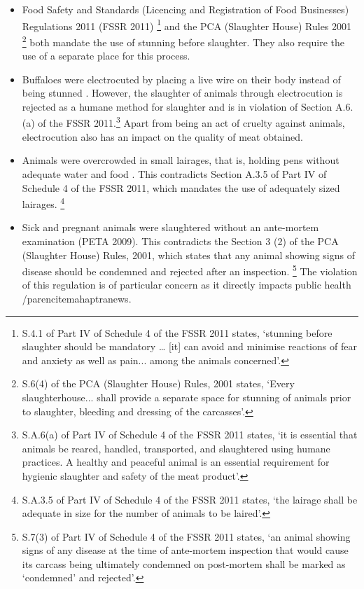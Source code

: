 \documentclass[a4paper, 12pt]{article}
\begin{document}
\begin{itemize}
\item Food Safety and Standards (Licencing and Registration of Food Businesses) Regulations 2011 (FSSR 2011) \footnote{S.4.1 of Part IV of Schedule 4 of the FSSR 2011 states, ‘stunning before slaughter should be mandatory … [it] can avoid and minimise reactions of fear and anxiety as well as pain... among the animals concerned’.} and the PCA (Slaughter House) Rules 2001 \footnote{ S.6(4) of the PCA (Slaughter House) Rules, 2001 states, ‘Every slaughterhouse... shall provide a separate space for stunning of animals prior to slaughter, bleeding and dressing of the carcasses’.} both mandate the use of stunning before slaughter. They also require the use of a separate place for this process.
\item Buffaloes were electrocuted by placing a live wire on their body instead of being stunned \parencite{indiannews} \parencite{petareport}. However, the slaughter of animals through electrocution is rejected as a humane method for slaughter \parencite{chaudrypaper} and is in violation of Section A.6.(a) of the FSSR 2011.\footnote{ S.A.6(a) of Part IV of Schedule 4 of the FSSR 2011 states, ‘it is essential that animals be reared, handled, transported, and slaughtered using humane practices. A healthy and peaceful animal is an essential requirement for hygienic slaughter and safety of the meat product’.} Apart from being an act of cruelty against animals, electrocution also has an impact on the quality of meat obtained.
\item Animals were overcrowded in small lairages, that is, holding pens without adequate water and food \parencite{maanvinews}. This contradicts Section A.3.5 of Part IV of Schedule 4 of the FSSR 2011, which mandates the use of adequately sized lairages. \footnote{ S.A.3.5 of Part IV of Schedule 4 of the FSSR 2011 states, ‘the lairage shall be adequate in size for the number of animals to be laired’.}
\item Sick and pregnant animals were slaughtered without an ante-mortem examination (PETA 2009). This contradicts the Section 3 (2) of the PCA (Slaughter House) Rules, 2001, which states that any animal showing signs of disease should be condemned and rejected after an inspection. \footnote{ S.7(3) of Part IV of Schedule 4 of the FSSR 2011 states, ‘an animal showing signs of any disease at the time of ante-mortem inspection that would cause its carcass being ultimately condemned on post-mortem shall be marked as ‘condemned’ and rejected’.} The violation of this regulation is of particular concern as it directly impacts public health /parencite{mahaptranews}.

\end{itemize}
\end{document}
